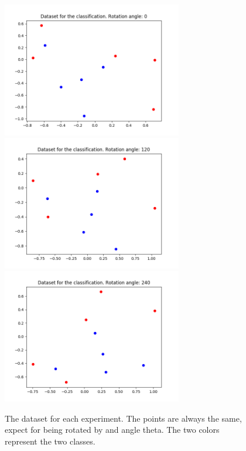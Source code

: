 \documentclass{article}
\begin{document}
\begin{figure}
\includegraphics[width=0.7\textwidth]{../theta0/points_wseed2angle0.png}
\includegraphics[width=0.7\textwidth]{../theta120/points_wseed2angle120.png}
\includegraphics[width=0.7\textwidth]{../theta240/points_wseed2angle240.png}
	\caption{The dataset for each experiment. The points are always
	the same, expect for being rotated by and angle theta. The two 
	colors represent the two classes.}
\end{figure}
\end{document}
